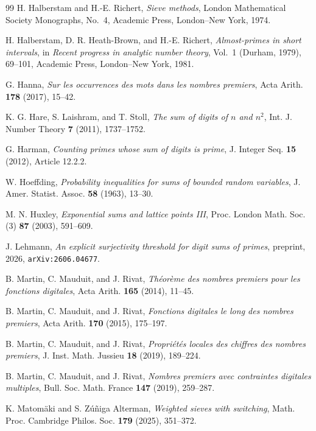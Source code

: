 \documentclass[11pt,reqno]{amsart}
\theoremstyle{plain}
\theoremstyle{definition}
\begin{document}
\begin{thebibliography}{99}
 H. Halberstam and H.-E. Richert, \emph{Sieve methods}, London Mathematical Society Monographs, No.~4, Academic Press, London--New York, 1974.

 H. Halberstam, D. R. Heath-Brown, and H.-E. Richert, \emph{Almost-primes in short intervals}, in \emph{Recent progress in analytic number theory}, Vol.~1 (Durham, 1979), 69--101, Academic Press, London--New York, 1981.

 G. Hanna, \emph{Sur les occurrences des mots dans les nombres premiers}, Acta Arith. \textbf{178} (2017), 15--42.

 K. G. Hare, S. Laishram, and T. Stoll, \emph{The sum of digits of $n$ and $n^2$}, Int. J. Number Theory \textbf{7} (2011), 1737--1752.

 G. Harman, \emph{Counting primes whose sum of digits is prime}, J. Integer Seq. \textbf{15} (2012), Article 12.2.2.

 W. Hoeffding, \emph{Probability inequalities for sums of bounded random variables}, J. Amer. Statist. Assoc. \textbf{58} (1963), 13--30.

 M. N. Huxley, \emph{Exponential sums and lattice points III}, Proc. London Math. Soc. (3) \textbf{87} (2003), 591--609.

 J. Lehmann, \emph{An explicit surjectivity threshold for digit sums of primes}, preprint, 2026, \texttt{arXiv:2606.04677}.

 B. Martin, C. Mauduit, and J. Rivat, \emph{Th\'eor\`eme des nombres premiers pour les fonctions digitales}, Acta Arith. \textbf{165} (2014), 11--45.

 B. Martin, C. Mauduit, and J. Rivat, \emph{Fonctions digitales le long des nombres premiers}, Acta Arith. \textbf{170} (2015), 175--197.

 B. Martin, C. Mauduit, and J. Rivat, \emph{Propri\'et\'es locales des chiffres des nombres premiers}, J. Inst. Math. Jussieu \textbf{18} (2019), 189--224.

 B. Martin, C. Mauduit, and J. Rivat, \emph{Nombres premiers avec contraintes digitales multiples}, Bull. Soc. Math. France \textbf{147} (2019), 259--287.

 K. Matom\"aki and S. Z\'u\~niga Alterman, \emph{Weighted sieves with switching}, Math. Proc. Cambridge Philos. Soc. \textbf{179} (2025), 351--372.


\end{thebibliography}
\end{document}
